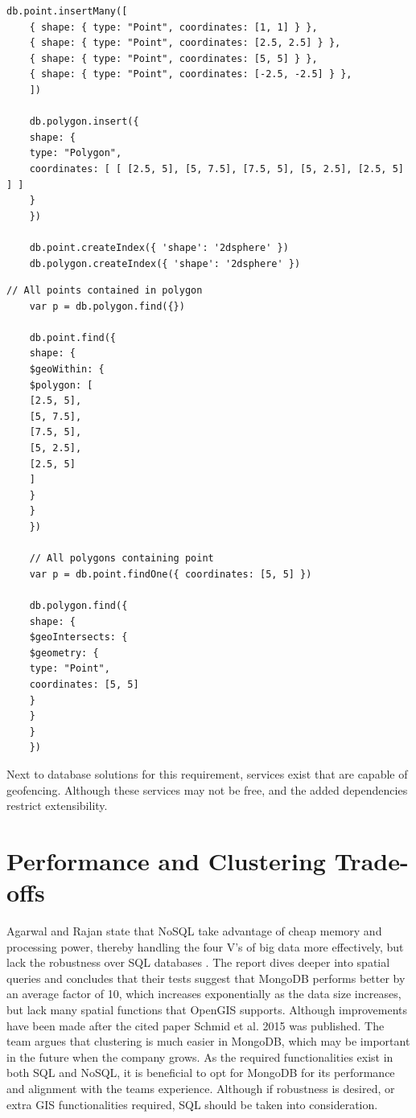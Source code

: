 \begin{multicols}{2}
	\begin{lstlisting}[caption={Select points contained in polygon}, label={lst:sql-pts-in-poly}, belowskip=100pt]
	db.point.insertMany([
	{ shape: { type: "Point", coordinates: [1, 1] } },
	{ shape: { type: "Point", coordinates: [2.5, 2.5] } },
	{ shape: { type: "Point", coordinates: [5, 5] } },
	{ shape: { type: "Point", coordinates: [-2.5, -2.5] } },
	])

	db.polygon.insert({
	shape: {
	type: "Polygon",
	coordinates: [ [ [2.5, 5], [5, 7.5], [7.5, 5], [5, 2.5], [2.5, 5] ] ]
	}
	})

	db.point.createIndex({ 'shape': '2dsphere' })
	db.polygon.createIndex({ 'shape': '2dsphere' })
\end{lstlisting}
	\begin{lstlisting}[caption={Select points contained in polygon}, label={lst:sql-pts-in-poly}, belowskip=0pt]
	// All points contained in polygon
	var p = db.polygon.find({})

	db.point.find({
	shape: {
	$geoWithin: {
	$polygon: [
	[2.5, 5],
	[5, 7.5],
	[7.5, 5],
	[5, 2.5],
	[2.5, 5]
	]
	}
	}
	})

	// All polygons containing point
	var p = db.point.findOne({ coordinates: [5, 5] })

	db.polygon.find({
	shape: {
	$geoIntersects: {
	$geometry: {
	type: "Point",
	coordinates: [5, 5]
	}
	}
	}
	})
\end{lstlisting}
\end{multicols}

Next to database solutions for this requirement, services exist that are capable of geofencing. Although these services may not be free, and the added dependencies restrict extensibility.

%
\section{Performance and Clustering Trade-offs}
Agarwal and Rajan state that NoSQL take advantage of cheap memory and processing power, thereby handling the four V’s of big data more effectively,
but lack the robustness over SQL databases . The report dives deeper into spatial queries and concludes that their tests suggest that MongoDB performs better by an average factor of 10, which increases exponentially as the data size increases, but lack many spatial functions that OpenGIS supports. Although improvements have been made  after the cited paper Schmid et al. 2015  was published. The team argues that clustering is much easier in MongoDB, which may be important in the future when the company grows. As the required functionalities exist in both SQL and NoSQL, it is beneficial to opt for MongoDB for its performance and alignment with the teams experience. Although if robustness is desired, or extra GIS functionalities required, SQL should be taken into consideration.
